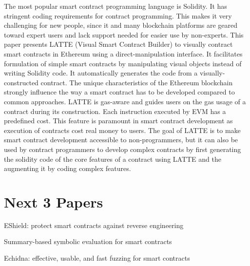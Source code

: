 \documentclass{article}
\begin{document}
The most popular smart contract programming language is Solidity. It has stringent coding requirements for contract programming. This makes it very challenging for new people, since it and many blockchain platforms are geared toward expert users and lack support needed for easier use by non-experts. This paper presents LATTE (Visual Smart Contract Builder) to visually contract smart contracts in Ethereum using a direct-manipulation interface. It facilitates formulation of simple smart contracts by manipulating visual objects instead of writing Solidity code. It automatically generates the code from a visually-constructed contract. The unique characteristics of the Ethereum blockchain strongly influence the way a smart contract has to be developed compared to common approaches. LATTE is gas-aware and guides users on the gas usage of a contract during its construction. Each instruction executed by EVM has a predefined cost. This feature is paramount in smart contract development as execution of contracts cost real money to users. The goal of LATTE is to make smart contract development accessible to non-programmers, but it can also be used by contract programmers to develop complex contracts by first generating the solidity code of the core features of a contract using LATTE and the augmenting it by coding complex features. 

\section{Next 3 Papers}
\item EShield: protect smart contracts against reverse engineering
\item Summary-based symbolic evaluation for smart contracts
\item Echidna: effective, usable, and fast fuzzing for smart contracts

\printbibliography
\end{document}
